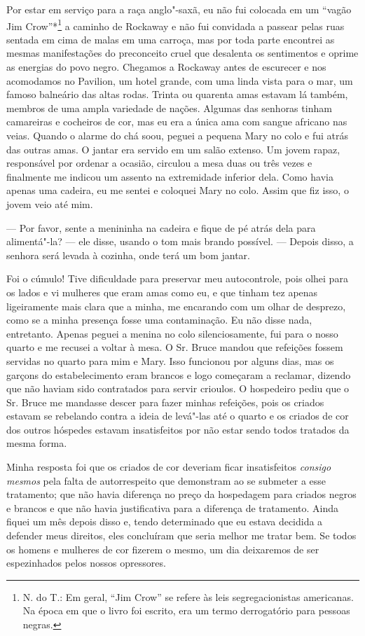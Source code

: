 Por estar em serviço para a raça
anglo"-saxã, eu não fui colocada em um ``vagão Jim Crow''*\footnote{N.
  do T.: Em geral, ``Jim Crow'' se refere às leis segregacionistas
  americanas. Na época em que o livro foi escrito, era um termo
  derrogatório para pessoas negras.} a caminho de Rockaway e não fui
convidada a passear pelas ruas sentada em cima de malas em uma carroça,
mas por toda parte encontrei as mesmas manifestações do preconceito
cruel que desalenta os sentimentos e oprime as energias do povo negro.
Chegamos a Rockaway antes de escurecer e nos acomodamos no Pavilion, um
hotel grande, com uma linda vista para o mar, um famoso balneário das
altas rodas. Trinta ou quarenta amas estavam lá também, membros de uma
ampla variedade de nações. Algumas das senhoras tinham camareiras e
cocheiros de cor, mas eu era a única ama com sangue africano nas veias.
Quando o alarme do chá soou, peguei a pequena Mary no colo e fui atrás
das outras amas. O jantar era servido em um salão extenso. Um jovem
rapaz, responsável por ordenar a ocasião, circulou a mesa duas ou três
vezes e finalmente me indicou um assento na extremidade inferior dela.
Como havia apenas uma cadeira, eu me sentei e coloquei Mary no colo.
Assim que fiz isso, o jovem veio até mim.

--- Por favor, sente a menininha na cadeira e fique de pé atrás dela
para alimentá"-la? --- ele disse, usando o tom mais brando possível. ---
Depois disso, a senhora será levada à cozinha, onde terá um bom jantar.

Foi o cúmulo! Tive dificuldade para
preservar meu autocontrole, pois olhei para os lados e vi mulheres que
eram amas como eu, e que tinham tez apenas ligeiramente mais clara que a
minha, me encarando com um olhar de desprezo, como se a minha presença
fosse uma contaminação. Eu não disse nada, entretanto. Apenas peguei a
menina no colo silenciosamente, fui para o nosso quarto e me recusei a
voltar à mesa. O Sr. Bruce mandou que refeições fossem servidas no
quarto para mim e Mary. Isso funcionou por alguns dias, mas os garçons
do estabelecimento eram brancos e logo começaram a reclamar, dizendo que
não haviam sido contratados para servir crioulos. O hospedeiro pediu que
o Sr. Bruce me mandasse descer para fazer minhas refeições, pois os
criados estavam se rebelando contra a ideia de levá"-las até o quarto e
os criados de cor dos outros hóspedes estavam insatisfeitos por não
estar sendo todos tratados da mesma forma.

Minha resposta foi que os criados de
cor deveriam ficar insatisfeitos \emph{consigo mesmos} pela falta de
autorrespeito que demonstram ao se submeter a esse tratamento; que não
havia diferença no preço da hospedagem para criados negros e brancos e
que não havia justificativa para a diferença de tratamento. Ainda fiquei
um mês depois disso e, tendo determinado que eu estava decidida a
defender meus direitos, eles concluíram que seria melhor me tratar bem.
Se todos os homens e mulheres de cor fizerem o mesmo, um dia deixaremos
de ser espezinhados pelos nossos opressores.

